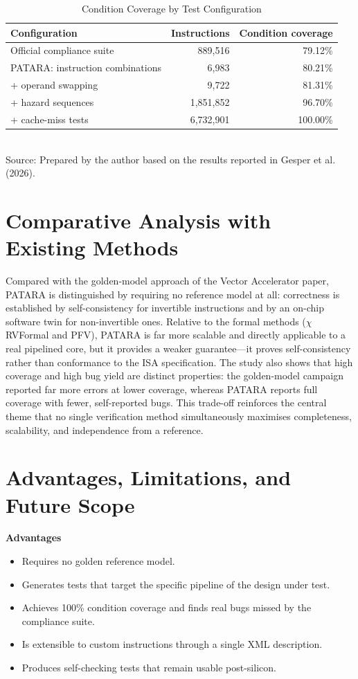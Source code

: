 \documentclass[12pt,a4paper]{report}
\begin{document}
\begin{table}[h]
\centering
\caption{Condition Coverage by Test Configuration}
\label{tab:results}
\begin{tabularx}{\textwidth}{Xrr}
\toprule
\textbf{Configuration} & \textbf{Instructions} & \textbf{Condition coverage}\\
\midrule
Official compliance suite            & 889{,}516   & 79.12\%\\
PATARA: instruction combinations     & 6{,}983     & 80.21\%\\
\quad + operand swapping             & 9{,}722     & 81.31\%\\
\quad + hazard sequences             & 1{,}851{,}852 & 96.70\%\\
\quad + cache-miss tests             & 6{,}732{,}901 & 100.00\%\\
\bottomrule
\end{tabularx}\\[4pt]
\footnotesize Source: Prepared by the author based on the results reported in Gesper et al.
(2026).
\end{table}

\section{Comparative Analysis with Existing Methods}
Compared with the golden-model approach of the Vector Accelerator paper, PATARA is
distinguished by requiring no reference model at all: correctness is established by
self-consistency for invertible instructions and by an on-chip software twin for
non-invertible ones. Relative to the formal methods ($\chi$RVFormal and PFV), PATARA is far
more scalable and directly applicable to a real pipelined core, but it provides a weaker
guarantee---it proves self-consistency rather than conformance to the ISA specification. The
study also shows that high coverage and high bug yield are distinct properties: the
golden-model campaign reported far more errors at lower coverage, whereas PATARA reports full
coverage with fewer, self-reported bugs. This trade-off reinforces the central theme that no
single verification method simultaneously maximises completeness, scalability, and
independence from a reference.

\section{Advantages, Limitations, and Future Scope}
\noindent\textbf{Advantages}
\begin{itemize}[nosep]
  \item Requires no golden reference model.
  \item Generates tests that target the specific pipeline of the design under test.
  \item Achieves 100\% condition coverage and finds real bugs missed by the compliance
        suite.
  \item Is extensible to custom instructions through a single XML description.
  \item Produces self-checking tests that remain usable post-silicon.
\end{itemize}
\end{document}
